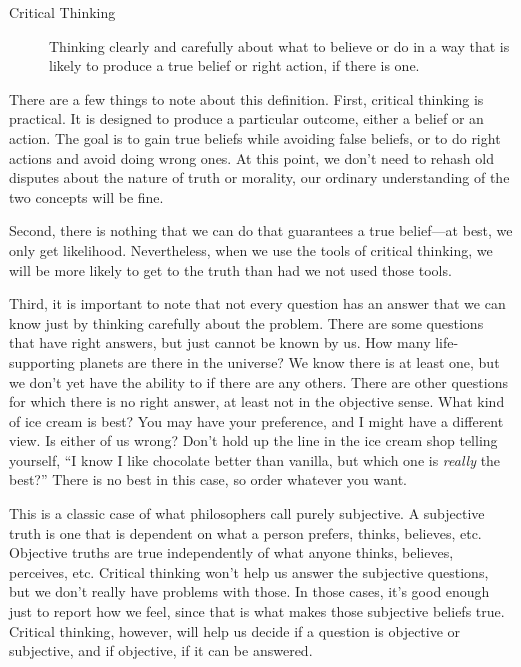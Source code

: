 \begin{description}
\item[Critical Thinking] Thinking clearly and carefully about what to believe or do in a way that is likely to produce a true belief or right action, if there is one. 
\end{description}





There are a few things to note about this definition. First, critical
thinking is practical. It is designed to produce a particular outcome,
either a belief or an action. The goal is to gain true beliefs while
avoiding false beliefs, or to do right actions and avoid doing wrong
ones. At this point, we don't need to rehash old disputes about the
nature of truth or morality, our ordinary understanding of the two
concepts will be fine.

Second, there is nothing that we can do that guarantees a true
belief---at best, we only get likelihood. Nevertheless, when we use the
tools of critical thinking, we will be more likely to get to the truth
than had we not used those tools.

Third, it is important to note that not every question has an answer
that we can know just by thinking carefully about the problem. There are
some questions that have right answers, but just cannot be known by us.
How many life-supporting planets are there in the universe? We know
there is at least one, but we don't yet have the ability to if there are
any others. There are other questions for which there is no right
answer, at least not in the objective sense. What kind of ice cream is
best? You may have your preference, and I might have a different view.
Is either of us wrong? Don't hold up the line in the ice cream shop
telling yourself, \enquote{I know I like chocolate better than vanilla, but
which one is \emph{really} the best?} There is no best in this case, so order
whatever you want.

This is a classic case of what philosophers call purely subjective. A
subjective truth is one that is dependent on what a person prefers,
thinks, believes, etc. Objective truths are true independently of what
anyone thinks, believes, perceives, etc. Critical thinking won't help us
answer the subjective questions, but we don't really have problems with
those. In those cases, it's good enough just to report how we feel,
since that is what makes those subjective beliefs true. Critical
thinking, however, will help us decide if a question is objective or
subjective, and if objective, if it can be answered.

